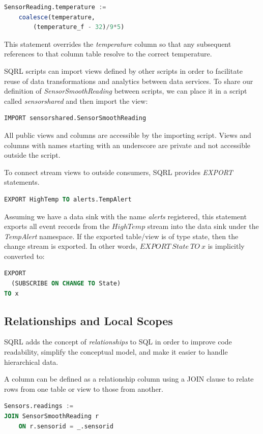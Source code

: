 \documentclass[	DIV=calc,%
							paper=letter,%
							fontsize=11pt,%
							twocolumn]{scrartcl}	 					%
\begin{document}
\begin{lstlisting}[language=SQL]
SensorReading.temperature :=
    coalesce(temperature,
        (temperature_f - 32)/9*5)
\end{lstlisting}

This statement overrides the \emph{temperature} column so that any subsequent references to that column table resolve to the correct temperature.

SQRL scripts can import views defined by other scripts in order to facilitate reuse of data transformations and analytics between data services. To share our definition of \emph{SensorSmoothReading} between scripts, we can place it in a script called \emph{sensorshared} and then import the view:
\begin{lstlisting}[language=SQL]
IMPORT sensorshared.SensorSmoothReading
\end{lstlisting}

All public views and columns are accessible by the importing script. Views and columns with names starting with an underscore are private and not accessible outside the script.

To connect stream views to outside consumers, SQRL provides \emph{EXPORT} statements.
\begin{lstlisting}[language=SQL]
EXPORT HighTemp TO alerts.TempAlert
\end{lstlisting}
Assuming we have a data sink with the name \emph{alerts} registered, this statement exports all event records from the $HighTemp$ stream into the data sink under the \emph{TempAlert} namespace. If the exported table/view is of type state, then the change stream is exported. In other words, $EXPORT\ State\ TO\ x$ is implicitly converted to:
\begin{lstlisting}[language=SQL]
EXPORT
  (SUBSCRIBE ON CHANGE TO State)
TO x
\end{lstlisting}

\subsection{Relationships and Local Scopes}

SQRL adds the concept of \emph{relationships} to SQL in order to improve code readability, simplify the conceptual model, and make it easier to handle hierarchical data.

A column can be defined as a relationship column using a JOIN clause to relate rows from one table or view to those from another.
\begin{lstlisting}[language=SQL]
Sensors.readings :=
JOIN SensorSmoothReading r
    ON r.sensorid = _.sensorid
\end{lstlisting}
\end{document}
